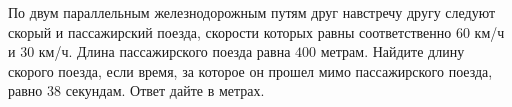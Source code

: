 \begin{class}[number=3]
\begin{listofex}
		\item По двум параллельным железнодорожным путям друг навстречу другу следуют скорый и пассажирский поезда, скорости которых равны соответственно \(60\) км/ч и \(30\) км/ч. Длина пассажирского поезда равна \(400\) метрам. Найдите длину скорого поезда, если время, за которое он прошел мимо пассажирского поезда, равно 38 секундам. Ответ дайте в метрах.
	\end{listofex}
\end{class}

